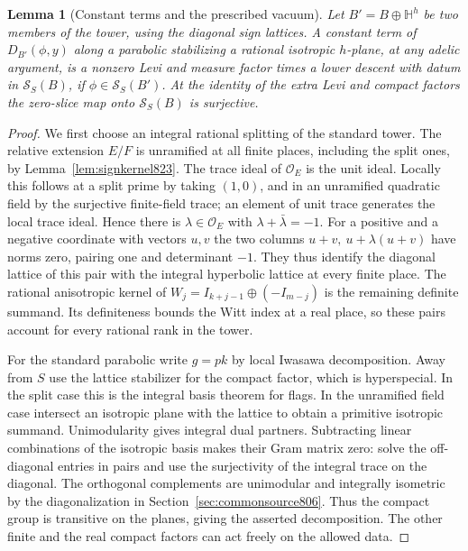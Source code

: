 \documentclass[a4paper,11pt]{article}
\newtheorem{lemma}[proposition]{Lemma}
\theoremstyle{definition}
\theoremstyle{remark}
\numberwithin{equation}{section}
\begin{document}
\begin{lemma}[Constant terms and the prescribed vacuum]
\leavevmode\label{lem:restrictedconstant848}
Let \(B'=B\oplus\mathbb H^h\) be two members of the tower, using
the diagonal sign lattices. A constant term of
\(D_{B'}(\phi,y)\) along a parabolic stabilizing a rational
isotropic \(h\)-plane, at any adelic argument, is a nonzero Levi
and measure factor times a lower descent with datum in
\(\mathcal S_S(B)\), if \(\phi\in\mathcal S_S(B')\).
At the identity of the extra Levi and compact factors the
zero-slice map onto \(\mathcal S_S(B)\) is surjective.
\end{lemma}
\begin{proof}
We first choose an integral rational splitting of the standard
tower. The relative extension \(E/F\) is unramified at all
finite places, including the split ones, by
Lemma~\ref{lem:signkernel823}. The trace ideal of
\(\mathcal O_E\) is the unit ideal. Locally this follows at a
split prime by taking \((1,0)\), and in an unramified quadratic
field by the surjective finite-field trace; an element of
unit trace generates the local trace ideal. Hence there is
\(\lambda\in\mathcal O_E\) with \(\lambda+\bar\lambda=-1\).
For a positive and a negative coordinate with vectors \(u,v\)
the two columns \(u+v,\ u+\lambda(u+v)\) have norms zero,
pairing one and determinant \(-1\). They thus identify the
diagonal lattice of this pair with the integral hyperbolic
lattice at every finite place. The rational anisotropic kernel
of \(W_j=I_{k+j-1}\oplus(-I_{m-j})\) is the remaining definite
summand. Its definiteness bounds the Witt index at a real place,
so these pairs account for every rational rank in the tower.

For the standard parabolic write \(g=p k\) by local Iwasawa
decomposition. Away from \(S\) use the lattice stabilizer for
the compact factor, which is hyperspecial. In the split case
this is the integral basis theorem for flags. In the unramified
field case intersect an isotropic plane with the lattice to
obtain a primitive isotropic summand. Unimodularity gives
integral dual partners. Subtracting linear combinations of the
isotropic basis makes their Gram matrix zero: solve the
off-diagonal entries in pairs and use the surjectivity of the
integral trace on the diagonal. The orthogonal complements are
unimodular and integrally isometric by the diagonalization in
Section~\ref{sec:commonsource806}. Thus the compact group is
transitive on the planes, giving the asserted decomposition.
The other finite and the real compact factors can act freely
on the allowed data.


\end{proof}
\end{document}
